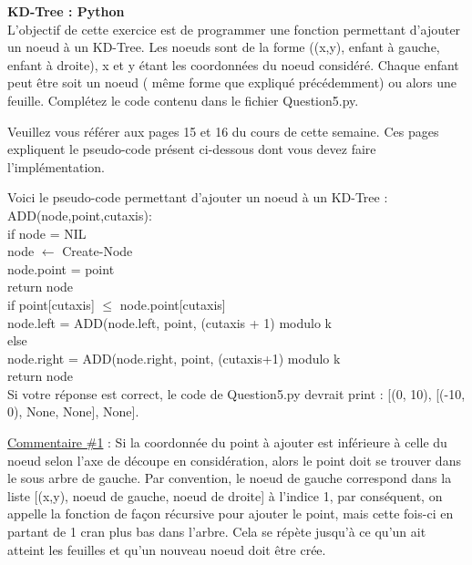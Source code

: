 \begin{Exercice}[15 minutes]\textbf{KD-Tree : Python}\\

L'objectif de cette exercice est de programmer une fonction permettant d'ajouter un noeud à un KD-Tree. Les noeuds sont de la forme ((x,y), enfant à gauche, enfant à droite), x et y étant les coordonnées du noeud considéré. Chaque enfant peut être soit un noeud ( même forme que expliqué précédemment) ou alors une feuille. Complétez le code contenu dans le fichier Question5.py.\\

\begin{conseil}
Veuillez vous référer aux pages 15 et 16 du cours de cette semaine. Ces pages expliquent le pseudo-code présent ci-dessous dont vous devez faire l'implémentation.

Voici le pseudo-code permettant d'ajouter un noeud à un KD-Tree :\\

ADD(node,point,cutaxis):\\
    \tabto{1cm}if node = NIL\\
        \tabto{2cm}node $\leftarrow$ Create-Node\\
        \tabto{2cm}node.point = point\\
        \tabto{2cm}return node\\
    \tabto{1cm}if point[cutaxis] $\leq$ node.point[cutaxis]\\
    \tabto{2cm} node.left = ADD(node.left, point, (cutaxis + 1) modulo k\\
    \tabto{1cm} else\\
    \tabto{2cm} node.right = ADD(node.right, point, (cutaxis+1) modulo k\\
    \tabto{1cm} return node\\
    
    Si votre réponse est correct, le code de Question5.py devrait print : [(0, 10), [(-10, 0), None, None], None].
\end{conseil}

\begin{solution}


\underline{Commentaire \#1} : Si la coordonnée du point à ajouter est inférieure à celle du noeud selon l'axe de découpe en considération, alors le point doit se trouver dans le sous arbre de gauche. Par convention, le noeud de gauche correspond dans la liste [(x,y), noeud de gauche, noeud de droite] à l'indice 1, par conséquent, on appelle la fonction de façon récursive pour ajouter le point, mais cette fois-ci en partant de 1 cran plus bas dans l'arbre. Cela se répète jusqu'à ce qu'un ait atteint les feuilles et qu'un nouveau noeud doit être crée.

\end{solution}
\end{Exercice}

